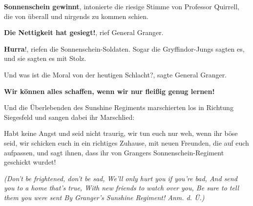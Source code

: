 \textbf{\glqq{}Sonnenschein gewinnt\grqq{}}, intonierte die riesige Stimme von
Professor Quirrell, die von überall und nirgends zu kommen schien.

\glqq{}\textbf{Die Nettigkeit hat gesiegt!}\grqq{}, rief General Granger.

\glqq{}\textbf{Hurra}!\grqq{}, riefen die Sonnenschein-Soldaten. Sogar die
Gryffindor-Jungs sagten es, und sie sagten es mit Stolz.

\glqq{}Und was ist die Moral von der heutigen Schlacht?\grqq{}, sagte General
Granger.

\textbf{\glqq{}Wir können alles schaffen, wenn wir nur fleißig genug
lernen!\grqq{}}

Und die Überlebenden des Sunshine Regiments marschierten los in Richtung
Siegesfeld und sangen dabei ihr Marschlied:

Habt keine Angst und seid nicht traurig, wir tun euch nur weh, wenn ihr böse
seid, wir schicken euch in ein richtiges Zuhause, mit neuen Freunden, die auf
euch aufpassen, und sagt ihnen, dass ihr von Grangers Sonnenschein-Regiment
geschickt wurdet!

\emph{(Don't be frightened, don't be sad, We'll only hurt you if you're bad, And
send you to a home that's true, With new friends to watch over you, Be sure to
tell them you were sent By Granger's Sunshine Regiment! Anm. d. Ü.)}

